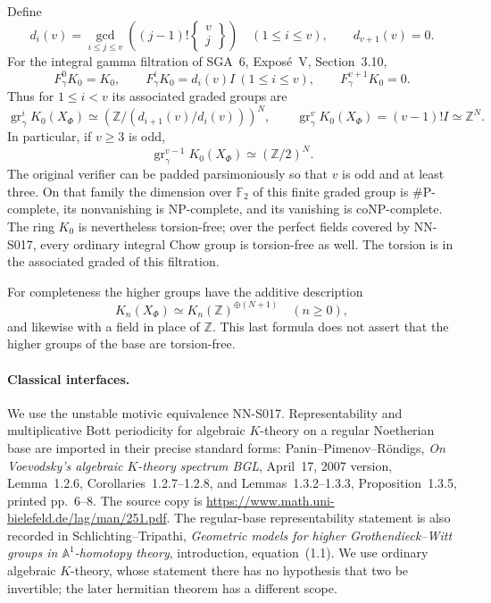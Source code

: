 Define
\[
 d_i(v)=\gcd_{i\le j\le v}\left((j-1)!
                    \left\{\begin{matrix}v\\j\end{matrix}\right\}\right)
           \quad(1\le i\le v),\qquad d_{v+1}(v)=0.
\]
For the integral gamma filtration of SGA~6, Expos\'e~V, Section~3.10,
\begin{equation}\label{eq:S018-filtration}
 F_\gamma^0K_0=K_0,\qquad F_\gamma^iK_0=d_i(v)I\ (1\le i\le v),\qquad
 F_\gamma^{v+1}K_0=0.
\end{equation}
Thus for $1\le i<v$ its associated graded groups are
\[
 \operatorname{gr}_\gamma^iK_0(X_\Phi)
       \simeq\left(\mathbb Z/(d_{i+1}(v)/d_i(v))\right)^N,
 \qquad
 \operatorname{gr}_\gamma^vK_0(X_\Phi)=(v-1)!I\simeq\mathbb Z^N.
\]
In particular, if $v\ge3$ is odd,
\begin{equation}\label{eq:S018-torsion}
             \operatorname{gr}_\gamma^{v-1}K_0(X_\Phi)
                        \simeq (\mathbb Z/2)^N.
\end{equation}
The original verifier can be padded parsimoniously so that $v$ is odd
and at least three. On that family the dimension over $\mathbb F_2$ of
this finite graded group is \#P-complete, its nonvanishing is
NP-complete, and its vanishing is coNP-complete. The ring $K_0$ is nevertheless torsion-free; over the perfect
fields covered by NN-S017, every ordinary integral Chow group
is torsion-free as well.
The torsion is in the associated graded of this filtration.

For completeness the higher groups have the additive description
\[
                         K_n(X_\Phi)\simeq K_n(\mathbb Z)^{\oplus(N+1)}
                         \quad(n\ge0),
\]
and likewise with a field in place of $\mathbb Z$. This last formula
does not assert that the higher groups of the base are torsion-free.

\paragraph{Classical interfaces.}
We use the unstable motivic equivalence NN-S017. Representability and
multiplicative Bott periodicity for algebraic $K$-theory on a regular
Noetherian base are imported in their precise standard forms:
Panin--Pimenov--R\"ondigs, \emph{On Voevodsky's algebraic $K$-theory
spectrum BGL}, April~17, 2007 version, Lemma~1.2.6,
Corollaries~1.2.7--1.2.8, and Lemmas~1.3.2--1.3.3,
Proposition~1.3.5, printed pp.~6--8. The source copy is
\url{https://www.math.uni-bielefeld.de/lag/man/251.pdf}.
The regular-base representability statement is also recorded in
Schlichting--Tripathi, \emph{Geometric models for higher
Grothendieck--Witt groups in $\mathbb A^1$-homotopy theory},
introduction, equation~(1.1). We use ordinary algebraic $K$-theory,
whose statement there has no hypothesis that two be invertible;
the later hermitian theorem has a different scope.

